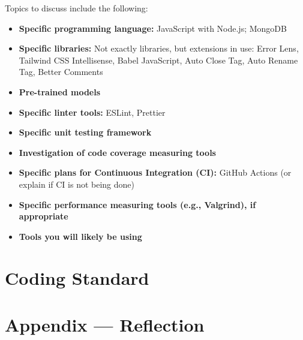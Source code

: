 \documentclass{article}
\begin{document}
Topics to discuss include the following:

\begin{itemize}
  \item \textbf{Specific programming language:} JavaScript with Node.js; MongoDB
  \item \textbf{Specific libraries:}  
        Not exactly libraries, but extensions in use: Error Lens, Tailwind CSS Intellisense, Babel JavaScript, Auto Close Tag, Auto Rename Tag, Better Comments
  \item \textbf{Pre-trained models}
  \item \textbf{Specific linter tools:} ESLint, Prettier
  \item \textbf{Specific unit testing framework}
  \item \textbf{Investigation of code coverage measuring tools}
  \item \textbf{Specific plans for Continuous Integration (CI):}  
        GitHub Actions (or explain if CI is not being done)
  \item \textbf{Specific performance measuring tools (e.g., Valgrind), if appropriate}
  \item \textbf{Tools you will likely be using}
\end{itemize}



\section{Coding Standard}


\newpage{}

\section*{Appendix --- Reflection}



\end{document}
